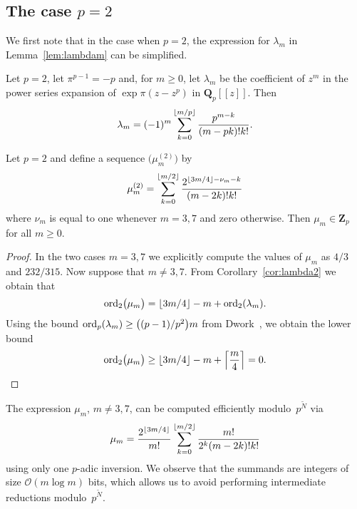 
\subsection{The case $p = 2$}

We first note that in the case when $p = 2$, the expression for 
$\lambda_m$ in Lemma~\ref{lem:lambdam} can be simplified.

\begin{cor} \label{cor:lambda2}
Let $p = 2$, let $\pi^{p-1} = -p$ and, for $m \geq 0$, let $\lambda_m$ 
be the coefficient of $z^m$ in the power series expansion of 
$\exp \pi (z - z^p)$ in $\mathbf{Q}_p[[z]]$.  Then 
\begin{equation*}
\lambda_m = (-1)^m \sum_{k=0}^{\left\lfloor m/p\right\rfloor} \frac{p^{m - k}}{(m - pk)! k!}.
\end{equation*}
\end{cor}

\begin{lem} \label{lem:mu2}
Let $p = 2$ and define a sequence $\bigl(\mu_m^{(2)}\bigr)$ by 
\begin{equation*}
\mu_m^{(2)} = 
    \sum_{k=0}^{\left\lfloor m/2\right\rfloor} \frac{2^{\left\lfloor3m/4\right\rfloor - \nu_m - k}}{(m-2k)! k!}
\end{equation*}
where $\nu_m$ is equal to one whenever $m = 3, 7$ and zero otherwise. 
Then $\mu_m \in \mathbf{Z}_p$ for all $m \geq 0$.
\end{lem}

\begin{proof}
In the two cases $m = 3, 7$ we explicitly compute the values of 
$\mu_m$ as $4/3$ and $232/315$.  Now suppose that $m \neq 3, 7$. 
From Corollary~\ref{cor:lambda2} we obtain that 
\begin{equation*}
\operatorname{ord}_2 \bigl(\mu_m\bigr) 
    = \left\lfloor3m/4\right\rfloor - m + \operatorname{ord}_2(\lambda_m).
\end{equation*}
Using the bound $\operatorname{ord}_p(\lambda_m) \geq \bigl((p-1)/p^2\bigr) m$ from 
Dwork~\citep[Pages~55--57]{Dwork62}, we obtain the lower bound 
\begin{equation*}
\operatorname{ord}_2 \bigl(\mu_m\bigr) 
    \geq \left\lfloor3m/4\right\rfloor - m + \left\lceil\frac{m}{4}\right\rceil = 0. \qedhere
\end{equation*}
\end{proof}

\begin{rem}
The expression $\mu_m$, $m \neq 3, 7$, can be computed efficiently 
modulo~$p^{\tilde{N}}$ via
\begin{equation*}
\mu_m = \frac{2^{\left\lfloor3m/4\right\rfloor}}{m!} 
    \sum_{k=0}^{\left\lfloor m/2\right\rfloor} \frac{m!}{2^k (m-2k)! k!}
\end{equation*}
using only one $p$-adic inversion.  We observe that the summands are 
integers of size $\mathcal{O}(m \log m)$ bits, which allows us to 
avoid performing intermediate reductions modulo~$p^{\tilde{N}}$.
\end{rem}

